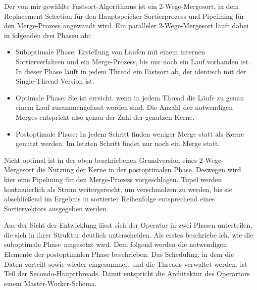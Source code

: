 \documentclass[a4paper,12pt,twoside]{article}
\begin{document}
Der von mir gewählte Fastsort-Algorithmus ist ein 2-Wege-Mergesort, in dem Replacement Selection für den Hauptspeicher-Sortierprozess und Pipelining für den Merge-Prozess angewandt wird. Ein paralleler 2-Wege-Mergesort läuft dabei in folgenden drei Phasen ab:

\begin{itemize}
	\item Suboptimale Phase: Erstellung von Läufen mit einem internen Sortierverfahren und ein Merge-Prozess, bis nur noch ein Lauf vorhanden ist. In dieser Phase läuft in jedem Thread ein Fastsort ab, der identisch mit der Single-Thread-Version ist.
	\item Optimale Phase: Sie ist erreicht, wenn in jedem Thread die Läufe zu genau einem Lauf zusammengefasst worden sind. Die Anzahl der notwendigen Merges entspricht also genau der Zahl der genutzen Kerne. 
	\item Postoptimale Phase: In jedem Schritt finden weniger Merge statt als Kerne genutzt werden. Im letzten Schritt findet nur noch ein Merge statt.
\end{itemize}

Nicht optimal ist in der oben beschriebenen Grundversion eines 2-Wege-Mergesort die Nutzung der Kerne in der postoptimalen Phase. Deswegen wird hier eine Pipelining für den Merge-Prozess vorgeschlagen. Tupel werden kontinuierlich als Strom weitergereicht, um verschmolzen zu werden, bis sie abschließend im Ergebnis in sortierter Reihenfolge entsprechend eines Sortiervektors ausgegeben werden. 

Aus der Sicht der Entwicklung lässt sich der Operator in zwei Phasen unterteilen, die sich in ihrer Struktur deutlich unterscheiden. Als erstes beschriebe ich, wie die suboptimale Phase umgesetzt wird. Dem folgend werden die notwendigen Elemente der postoptimalen Phase beschrieben. Das Scheduling, in dem die Daten verteilt sowie wieder eingesammelt und die Threads verwaltet werden, ist Teil der Secondo-Hauptthreads. Damit entspricht die Architektur des Operartors einem Master-Worker-Schema.
\end{document}
